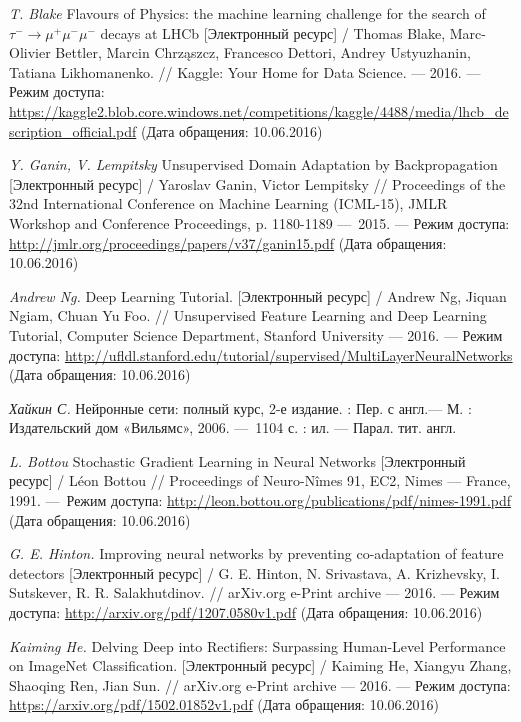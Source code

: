\documentclass[14pt, a4paper]{extarticle}
\begin{document}
\begin{thebibliography}{3}  

\textit{T. Blake} Flavours of Physics: the machine learning challenge for the search of $\tau^-\rightarrow\mu^+ \mu^- \mu^-$ decays at LHCb [Электронный ресурс] / Thomas Blake, Marc-Olivier Bettler, Marcin Chrząszcz, Francesco Dettori, Andrey Ustyuzhanin, Tatiana Likhomanenko. // Kaggle: Your Home for Data Science. — 2016. — Режим доступа: 
	\url{https://kaggle2.blob.core.windows.net/competitions/kaggle/4488/media/lhcb_description_official.pdf} (Дата обращения: 10.06.2016)

\textit{Y. Ganin, V. Lempitsky} Unsupervised Domain Adaptation by Backpropagation [Электронный ресурс] / Yaroslav Ganin, Victor Lempitsky // Proceedings of the 32nd International Conference on Machine Learning (ICML-15), JMLR Workshop and Conference Proceedings, p. 1180-1189 — 2015. — Режим доступа: \url{http://jmlr.org/proceedings/papers/v37/ganin15.pdf} (Дата обращения: 10.06.2016)

\textit{Andrew Ng.} Deep Learning Tutorial. [Электронный ресурс] / Andrew Ng, Jiquan Ngiam, Chuan Yu Foo. //
Unsupervised Feature Learning and Deep Learning Tutorial, Computer Science Department, Stanford University — 2016. — Режим доступа: \url{http://ufldl.stanford.edu/tutorial/supervised/MultiLayerNeuralNetworks} (Дата обращения: 10.06.2016)

\textit{Хайкин С.} Нейронные сети: полный курс, 2-е издание. : Пер. с англ.— М. : Издательский дом «Вильямс», 2006. — 1104 с. : ил. — Парал. тит. англ.

\textit{L. Bottou} Stochastic Gradient Learning in Neural Networks [Электронный ресурс] / Léon Bottou // Proceedings of Neuro-Nîmes 91, EC2, Nimes — France, 1991. — Режим доступа: \url{http://leon.bottou.org/publications/pdf/nimes-1991.pdf} (Дата обращения: 10.06.2016)

\textit{G. E. Hinton.} Improving neural networks by preventing
co-adaptation of feature detectors [Электронный ресурс] / G. E. Hinton, N. Srivastava, A. Krizhevsky, I. Sutskever, R. R. Salakhutdinov. // arXiv.org e-Print archive — 2016. — Режим доступа: \url{http://arxiv.org/pdf/1207.0580v1.pdf} (Дата обращения: 10.06.2016)

\textit{Kaiming He.} Delving Deep into Rectifiers:
Surpassing Human-Level Performance on ImageNet Classification. [Электронный ресурс] / Kaiming He, Xiangyu Zhang, Shaoqing Ren, Jian Sun. // arXiv.org e-Print archive — 2016. — Режим доступа: \url{https://arxiv.org/pdf/1502.01852v1.pdf}  (Дата обращения: 10.06.2016)


\end{thebibliography}
\end{document}
